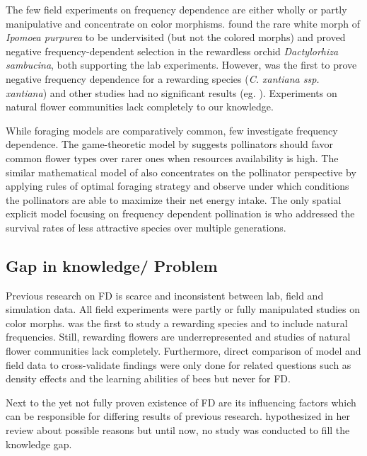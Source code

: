 The few field experiments on frequency dependence are either wholly or partly manipulative and concentrate on color morphisms. \cite{epperson1987frequency} found the rare white morph of \textit{Ipomoea purpurea} to be undervisited (but not the colored morphs) and \cite{gigord2001negative} proved negative frequency-dependent selection in the rewardless orchid \textit{Dactylorhiza sambucina}, both supporting the lab experiments. However, \cite{Eckhart2006frequency} was the first to prove negative frequency dependence for a rewarding species (\textit{C. xantiana ssp. xantiana}) and other studies had no significant results (eg. \citealt{jones1996pollinator, mogford1978pollination}). Experiments on natural flower communities lack completely to our knowledge. 

While foraging models are comparatively common, few investigate frequency dependence. The game-theoretic model by \cite{kunin1996pollinator} suggests pollinators should favor common flower types over rarer ones when resources availability is high. The similar mathematical model of \cite{song2014adaptive} also concentrates on the pollinator perspective by applying rules of optimal foraging strategy and observe under which conditions the pollinators are able to maximize their net energy intake. The only spatial explicit model focusing on frequency dependent pollination is \cite{hanoteaux2013effects} who addressed the survival rates of less attractive species over multiple generations. 

\subsection*{Gap in knowledge/ Problem}

Previous research on FD is scarce and inconsistent between lab, field and simulation data.
All field experiments were partly or fully manipulated studies on color morphs. \cite{Eckhart2006frequency} was the first to study a rewarding species and to include natural frequencies. Still, rewarding flowers are underrepresented and studies of natural flower communities lack completely.  Furthermore, direct comparison of model and field data to cross-validate findings were only done for related questions such as density effects \citep{essenberg2012explaining} and the learning abilities of bees \citep{dyer2014bee} but never for FD.  

Next to the yet not fully proven existence of FD are its influencing factors which can be responsible for  differing results of previous research. \cite{smithson2001pollinator} hypothesized in her review about possible reasons but until now, no study was conducted to fill the knowledge gap. 

